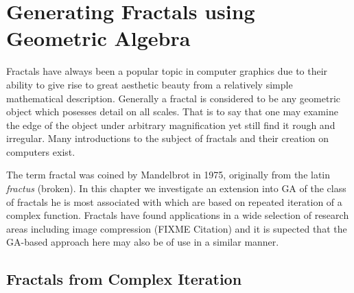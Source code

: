 \chapter{Generating Fractals using Geometric Algebra}

Fractals have always been a popular topic in computer graphics due to their
ability to give rise to great aesthetic beauty from a relatively simple
mathematical description. Generally a fractal is considered to be any
geometric object which posesses detail on all
scales\cite{FRAC:FractalsEverywhere, FRAC:FractalGeometryOfNature}. That is to
say that one may examine the edge of the object under arbitrary magnification
yet still find it rough and irregular. Many introductions to the subject of
fractals and their creation on computers exist\cite{FRAC:FractalGeometry,
  FRAC:ChaosAndFractals, FRAC:FractalImages}.

The term fractal was coined by Mandelbrot\cite{FRAC:LesObjetsFractals} in 1975,
originally from the latin {\em fractus} (broken). In this chapter we
investigate an extension into GA of the class of fractals he is most 
associated with which are based on repeated iteration of a complex function.
Fractals have found applications in a wide selection of research areas
including image compression (FIXME Citation) and it is supected that the 
GA-based approach here may also be of use in a similar manner.

\section{Fractals from Complex Iteration}

